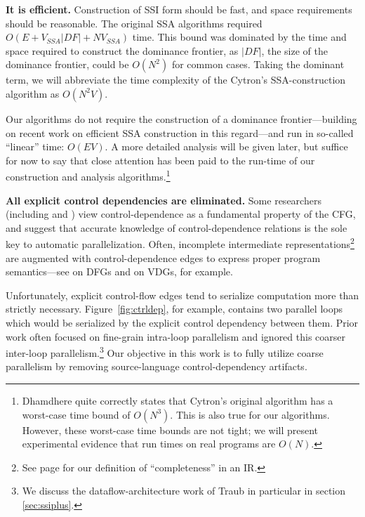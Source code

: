 \documentclass[12pt,titlepage]{article}
\begin{document}
\textbf{It is efficient.}  Construction of SSI form should be fast,
and space requirements should be reasonable.  The original SSA
algorithms required $O(E+V_{SSA}|{DF}|+NV_{SSA})$ time.  This bound
was dominated by the time and space required to construct the
dominance frontier, as $|{DF}|$, the size of the dominance frontier,
could be $O(N^2)$ for common cases.  Taking the dominant term, we will
abbreviate the time complexity of the Cytron's SSA-construction
algorithm as $O(N^2 V)$.

Our algorithms do not require the construction of a dominance
frontier---building on recent work on efficient SSA construction in
this regard---and run in so-called ``linear'' time: $O(EV)$.  A more
detailed analysis will be given later, but suffice for now to say that
close attention has been paid to the run-time of our construction and
analysis algorithms.\footnote{Dhamdhere \cite{dhamdhere92:large} quite
correctly states that Cytron's original algorithm has a worst-case
time bound of $O(N^3)$.  This is also true for our algorithms.
However, these worst-case time bounds are not tight; we will present
experimental evidence that run times on real programs are $O(N)$.}
       

\textbf{All explicit control dependencies are eliminated.}
Some researchers (including \cite{appel:modern} and
\cite{pingali97:apt}) view control-dependence as a fundamental
property of the CFG, and \cite{ballance90:pdw,appel:modern} suggest
that accurate knowledge of control-dependence relations is the sole
key to automatic parallelization.  Often, incomplete intermediate
representations\footnote{See page \pageref{sec:complete} for our
definition of ``completeness'' in an IR.} are augmented with
control-dependence edges to express proper program semantics---see
\cite{johnson93:dfg} on DFGs and \cite{weise94:vdg} on VDGs, for
example.

Unfortunately, explicit control-flow edges tend to serialize
computation more than strictly necessary.  Figure~\vref{fig:ctrldep},
for example, contains two parallel loops which would be serialized by
the explicit control dependency between them.  Prior work often
focused on fine-grain intra-loop parallelism and ignored this coarser
inter-loop parallelism.\footnote{We discuss the dataflow-architecture
work of Traub \cite{traub86:ttda} in particular in section
\ref{sec:ssiplus}.} Our objective in this work is to fully utilize
coarse parallelism by removing source-language control-dependency artifacts.
\end{document}
